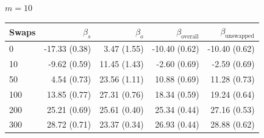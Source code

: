 \begin{table}[H]
\begin{tabular}{l rrrr}
\bottomrule
\end{tabular}
\par\medskip
\noindent\textit{$m = 10$}\\[2pt]
\begin{tabular}{l rrrr}
\toprule
Swaps & $\beta_s$ & $\beta_o$ & $\beta_{\mathrm{overall}}$ & $\beta_{\mathrm{unswapped}}$ \\
\midrule
0 & -17.33 (0.38) & 3.47 (1.55) & -10.40 (0.62) & -10.40 (0.62) \\
10 & -9.62 (0.59) & 11.45 (1.43) & -2.60 (0.69) & -2.59 (0.69) \\
50 & 4.54 (0.73) & 23.56 (1.11) & 10.88 (0.69) & 11.28 (0.73) \\
100 & 13.85 (0.77) & 27.31 (0.76) & 18.34 (0.59) & 19.24 (0.64) \\
200 & 25.21 (0.69) & 25.61 (0.40) & 25.34 (0.44) & 27.16 (0.53) \\
300 & 28.72 (0.71) & 23.37 (0.34) & 26.93 (0.44) & 28.88 (0.62) \\
\bottomrule
\end{tabular}
\end{table}

